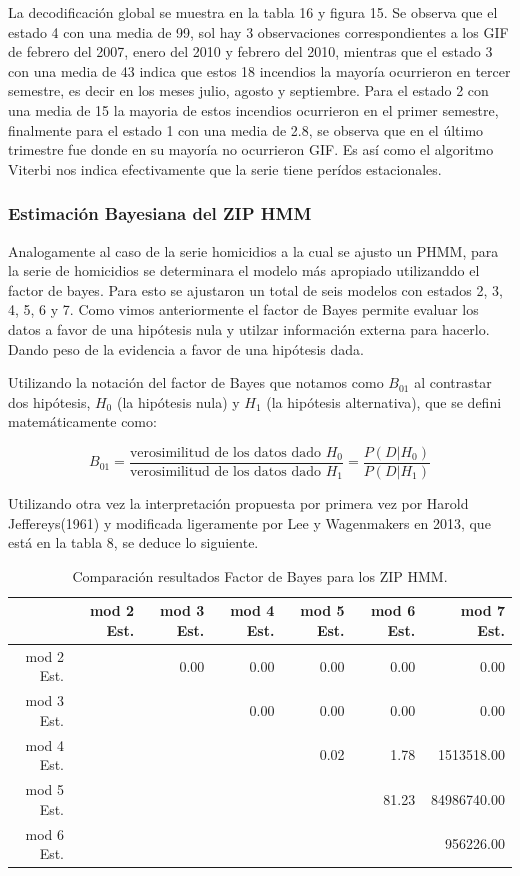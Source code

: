 \documentclass[a4paper]{article}\usepackage[]{graphicx}\usepackage[]{color}
\begin{document}
La decodificación global se muestra en la tabla 16 y figura 15. Se observa que el estado 4 con una media de 99, sol hay 3 observaciones correspondientes a los GIF de febrero del 2007, enero del 2010 y febrero del 2010, mientras que el estado 3 con una media de 43 indica que estos 18 incendios la mayoría ocurrieron en tercer semestre, es decir en los meses julio, agosto y septiembre. Para el estado 2 con una media de 15 la mayoria de estos incendios ocurrieron en el primer semestre, finalmente para el estado 1 con una media de 2.8, se observa que en el último trimestre fue donde en su mayoría no ocurrieron GIF. Es así como el algoritmo Viterbi nos indica efectivamente que la serie tiene perídos estacionales.





\vspace{5mm} %

\subsubsection*{Estimación Bayesiana del ZIP HMM}

Analogamente al caso de la serie homicidios a la cual se ajusto un PHMM, para la serie de homicidios se determinara el modelo más apropiado utilizanddo el factor de bayes. Para esto se ajustaron un total de seis modelos con estados 2, 3, 4, 5, 6 y 7. Como vimos anteriormente el factor de Bayes permite evaluar los datos a favor de una hipótesis nula y utilzar información externa para hacerlo. Dando peso de la evidencia a favor de una hipótesis dada.

Utilizando la notación del factor de Bayes que notamos como $B_{01}$ al contrastar dos hipótesis, $H_0$ (la hipótesis nula) y $H_1$ (la hipótesis alternativa), que se defini matemáticamente como:

$$B_{01} = \frac{\text{verosimilitud de los datos dado $H_0$}}{\text{verosimilitud de los datos dado $H_1$}} = \frac{P(D | H_0)}{P(D | H_1)}$$

Utilizando otra vez la interpretación propuesta por primera vez por Harold Jeffereys(1961) y modificada ligeramente por Lee y Wagenmakers en 2013, que está en la tabla 8, se deduce lo siguiente.

\begin{table}[ht]
\centering
\begin{tabular}{rrrrrrr}
  \hline
 & mod 2 Est. & mod 3 Est. & mod 4 Est. & mod 5 Est. & mod 6 Est. & mod 7 Est. \\ 
  \hline
mod 2 Est. &  & 0.00 & 0.00 & 0.00 & 0.00 & 0.00 \\ 
  mod 3 Est. &  &  & 0.00 & 0.00 & 0.00 & 0.00 \\ 
  mod 4 Est. &  &  &  & 0.02 & 1.78 & 1513518.00 \\ 
  mod 5 Est. &  &  &  &  & 81.23 & 84986740.00 \\ 
  mod 6 Est. &  &  &  &  &  & 956226.00 \\ 
   \hline
\end{tabular}
\caption{Comparación resultados Factor de Bayes para los ZIP HMM.} 
\end{table}
\end{document}
